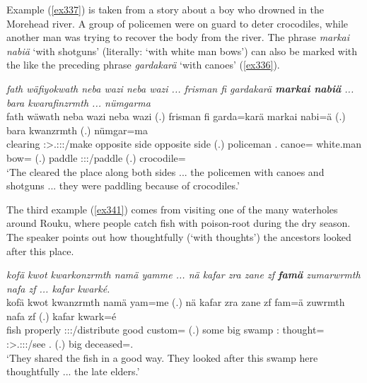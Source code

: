 Example (\ref{ex337}) is taken from a story about a boy who drowned in the Morehead river. A group of policemen were on guard to deter crocodiles, while another man was trying to recover the body from the river. The phrase \emph{markai nabiä} `with shotguns' (literally: `with white man bows') can also be marked with the   like the preceding phrase \emph{gardakarä} `with canoes' (\ref{ex336}).

\begin{exe}
	\ex \emph{fath wäfiyokwath neba wazi neba wazi ... frisman fi gardakarä \textbf{markai nabiä} ... bara kwarafinzrmth ... nümgarma}\\
	\gll fath wäwath neba wazi neba wazi (.) frisman fi garda=karä markai nabi=ä (.) bara kwanzrmth (.) nümgar=ma\\
	clearing \Stpl:\Sbj>\Tsg.\F:\Obj:\Nonpast:\Ipfv/make opposite side opposite side (.) policeman \Third.\Abs{} canoe=\Prop{} {white.man} bow=\Assoc{} (.) paddle \Stpl:\Sbj:\Pst:\Dur/paddle (.) crocodile=\Char{}\\
	\trans `The cleared the place along both sides ... the policemen with canoes and shotguns ... they were paddling because of crocodiles.'\\
	\label{ex337}
\end{exe}

The third example (\ref{ex341}) comes from visiting one of the many waterholes around Rouku, where people catch fish with poison-root during the dry season. The speaker points out how thoughtfully (`with thoughts') the ancestors looked after this place.

\begin{exe}
	\ex \emph{kofä kwot kwarkonzrmth namä yamme ... nä kafar zra zane zf \textbf{famä} zumarwrmth nafa zf ... kafar kwarké.}\\
	\gll kofä kwot kwanzrmth namä yam=me (.) nä kafar zra zane zf fam=ä zuwrmth nafa zf (.) kafar kwark=é\\
	fish properly \Stpl:\Sbj:\Pst:\Dur/distribute good custom=\Ins{} (.) some big swamp \Dem:\Prox{} \Imm{} thought=\Assoc{} \Stpl:\Sbj>\Tsg.\F:\Obj:\Pst:\Dur/see \Tnsg.\Erg{} \Imm{} (.) big deceased=\Erg.\Nsg{}\\
	\trans `They shared the fish in a good way. They looked after this swamp here thoughtfully ... the late elders.'
	\label{ex341}
\end{exe}

